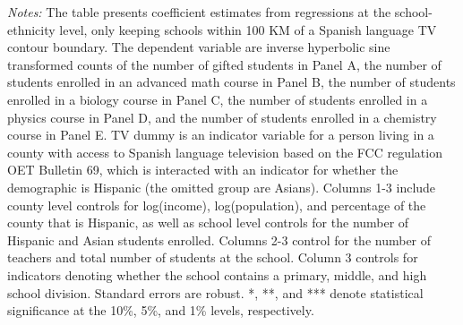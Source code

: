 \begin{table}[!htbp]
{\begin{threeparttable}
\begin{tablenotes}[flushleft]
				\item \textit{Notes:} The table presents coefficient estimates from regressions at the school-ethnicity level, only keeping schools within 100 KM of a Spanish language TV contour boundary. The dependent variable are inverse hyperbolic sine transformed counts of the number of gifted students in Panel A, the number of students enrolled in an advanced math course in Panel B, the number of students enrolled in a biology course in Panel C, the number of students enrolled in a physics course in Panel D, and the number of students enrolled in a chemistry course in Panel E. TV dummy is an indicator variable for a person living in a county with access to Spanish language television based on the FCC regulation OET Bulletin 69, which is interacted with an indicator for whether the demographic is Hispanic (the omitted group are Asians). Columns 1-3 include county level controls for log(income), log(population), and percentage of the county that is Hispanic, as well as school level controls for the number of Hispanic and Asian students enrolled. Columns 2-3 control for the number of teachers and total number of students at the school. Column 3 controls for indicators denoting whether the school contains a primary, middle, and high school division. Standard errors are robust. *, **, and *** denote statistical significance at the 10\%, 5\%, and 1\% levels, respectively.
			\end{tablenotes}
		\end{threeparttable}
	}
\end{table}